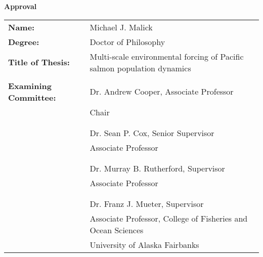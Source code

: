 

\begin{center}
{ \large \textbf{Approval} }
\end{center}

\vspace{4mm}

\hspace*{-1cm} \begin{tabular}{ l p{94mm} }
  \textbf{Name:} & Michael J. Malick \\
  \textbf{Degree:} & Doctor of Philosophy \\
  \textbf{Title of Thesis:} & Multi-scale environmental forcing of Pacific
  salmon population dynamics \\

  & \\

  \textbf{Examining Committee:} & Dr. Andrew Cooper, Associate Professor \\
                                & Chair \\

    & \\

    & \\ \cline{2-2}
    & Dr. Sean P. Cox, Senior Supervisor \\
    & Associate Professor \\

    & \\

    & \\ \cline{2-2}
    & Dr. Murray B. Rutherford, Supervisor \\
    & Associate Professor \\

    & \\

    & \\ \cline{2-2}
    & Dr. Franz J. Mueter, Supervisor \\
    & Associate Professor, College of Fisheries and Ocean Sciences\\
    & University of Alaska Fairbanks\\


\end{tabular}
